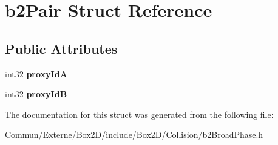 \hypertarget{structb2_pair}{}\section{b2\+Pair Struct Reference}
\label{structb2_pair}
\subsection*{Public Attributes}
\begin{DoxyCompactItemize}
\item 
int32 {\bfseries proxy\+IdA}\hypertarget{structb2_pair_abae3df5e877cf0c4611334e3eec4b84c}{}\label{structb2_pair_abae3df5e877cf0c4611334e3eec4b84c}

\item 
int32 {\bfseries proxy\+IdB}\hypertarget{structb2_pair_af2bd888ccb34535ab9126497349da749}{}\label{structb2_pair_af2bd888ccb34535ab9126497349da749}

\end{DoxyCompactItemize}


The documentation for this struct was generated from the following file\+:\begin{DoxyCompactItemize}
\item 
Commun/\+Externe/\+Box2\+D/include/\+Box2\+D/\+Collision/b2\+Broad\+Phase.\+h\end{DoxyCompactItemize}
